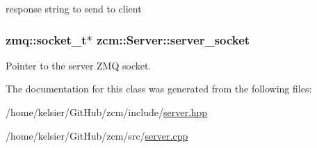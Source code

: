 response string to send to client 

\hypertarget{classzcm_1_1Server_a4312bf38cfd6bb1d169d6bd3682651e3}{
\subsubsection[{server\-\_\-socket}]{\setlength{\rightskip}{0pt plus 5cm}zmq\-::socket\-\_\-t$\ast$ zcm\-::\-Server\-::server\-\_\-socket\hspace{0.3cm}{\ttfamily [private]}}}\label{classzcm_1_1Server_a4312bf38cfd6bb1d169d6bd3682651e3}


Pointer to the server Z\-M\-Q socket. 



The documentation for this class was generated from the following files\-:\begin{DoxyCompactItemize}
\item 
/home/kelsier/\-Git\-Hub/zcm/include/\hyperlink{server_8hpp}{server.\-hpp}\item 
/home/kelsier/\-Git\-Hub/zcm/src/\hyperlink{server_8cpp}{server.\-cpp}\end{DoxyCompactItemize}
